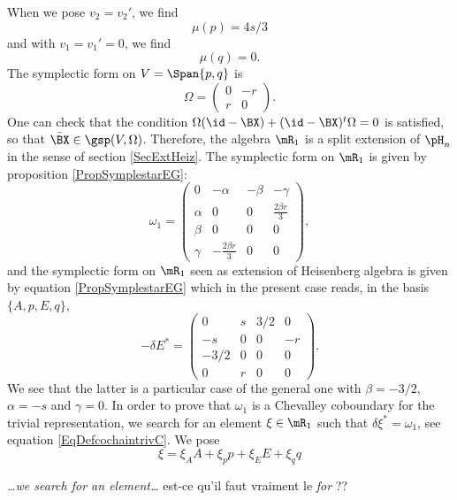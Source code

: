 When we pose $v_2=v_2'$, we find
\begin{equation}
\mu(p)=4s/3
\end{equation}
and with $v_1=v_1'=0$, we find
\begin{equation}
\mu(q)=0.
\end{equation}
The symplectic form on $V=\Span\{ p,q \}$ is 
\begin{equation}
 \Omega=\begin{pmatrix}
0&-r\\
r&0
\end{pmatrix}.
\end{equation}
One can check that the condition $\Omega(\id-\BX)+(\id-\BX)^{t}\Omega=0$ is satisfied, so that $\bar{\BX}\in\gsp(V,\Omega)$. Therefore, the algebra $\mR_{1}$ is a split extension of $\pH_{n}$ in the sense of section \ref{SecExtHeiz}. The symplectic form on $\mR_1$ is given by proposition \eqref{PropSymplestarEG}:
 \begin{equation}
\omega_{1}=\begin{pmatrix}
0   &-\alpha        &-\beta &-\gamma\\
\alpha  &0          &0  &\frac{ 2\beta r }{ 3 }\\
\beta   &0          &0  &0\\
\gamma  &-\frac{ 2\beta r }{ 3 }    &0  &0
\end{pmatrix},
\end{equation}
and the symplectic form on $\mR_1$ seen as extension of Heisenberg algebra is given by equation \eqref{PropSymplestarEG} which in the present case reads, in the basis $\{ A,p,E,q \}$,
\begin{equation}
-\delta E^*=
\begin{pmatrix}
0&s&3/2&0\\
-s&0&0&-r\\
-3/2&0&0&0\\
0&r&0&0
\end{pmatrix}.
\end{equation}
We see that the latter is a particular case of the general one with $\beta=-3/2$, $\alpha=-s$ and $\gamma=0$. In order to prove that $\omega_{1}$ is a Chevalley coboundary for the trivial representation, we search for an element $\xi\in\mR_1$ such that $\delta\xi^*=\omega_{1}$, see equation \eqref{EqDefcochaintrivC}. We pose
\[ 
  \xi=\xi_{A}A+\xi_{p}p+\xi_{E}E+\xi_{q}q
\]

\begin{probleme}
\emph{\ldots we search for an element\ldots} est-ce qu'il faut vraiment le \emph{for} ??
\end{probleme}

